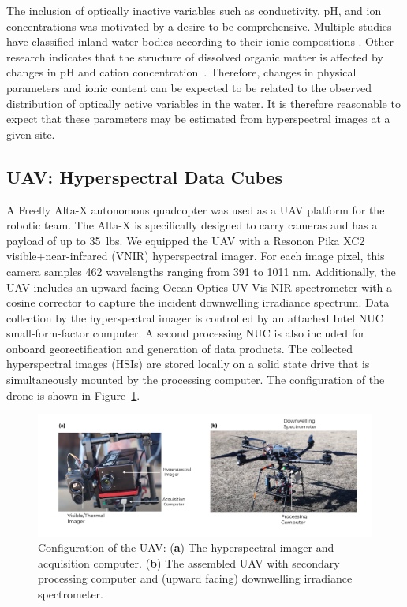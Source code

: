 \documentclass[remotesensing,article,accept,pdftex,moreauthors]{Definitions/mdpi}
\begin{document}
The inclusion of optically inactive variables such as conductivity, pH, and ion concentrations was motivated by a desire to be comprehensive. Multiple studies have classified inland water bodies according to their ionic compositions \cite{piper1944graphic, dordoni2023preliminary}. Other research indicates that the structure of dissolved organic matter is affected by changes in pH and cation concentration~\cite{pace2012ph}. Therefore, changes in physical parameters and ionic content can be expected to be related to the observed distribution of optically active variables in the water. It is therefore reasonable to expect that these parameters may be estimated from hyperspectral images at a given site. 


\subsection{UAV: Hyperspectral Data Cubes}

A Freefly Alta-X autonomous quadcopter was used as a UAV platform for the robotic team. The Alta-X is specifically designed to carry cameras and has a payload of up to 35~lbs. We equipped the UAV with a Resonon Pika XC2 visible+near-infrared (VNIR) hyperspectral imager. For each image pixel, this camera samples 462 wavelengths ranging from 391 to 1011 nm.  Additionally, the UAV includes an upward facing Ocean Optics UV-Vis-NIR spectrometer with a cosine corrector to capture the incident downwelling irradiance spectrum. Data collection by the hyperspectral imager is controlled by an attached Intel NUC small-form-factor computer. A second processing NUC is also included for onboard georectification and generation of data products. The collected hyperspectral images (HSIs) are stored locally on a solid state drive that is simultaneously mounted by the processing computer. The configuration of the drone is shown in Figure~\ref{fig:drone-components}.

\begin{figure}[H]
\vspace{-0.3in}
\hspace{-16pt}\includegraphics[width=\columnwidth]{figures/materials-and-methods/annotated-drone.pdf}
\vspace{-0.2in}
\caption{Configuration of the UAV: (\textbf{a}) The hyperspectral imager and acquisition computer. (\textbf{b}) The assembled UAV with secondary processing computer and (upward facing) downwelling irradiance spectrometer. \label{fig:drone-components}}
\end{figure} 
\end{document}
